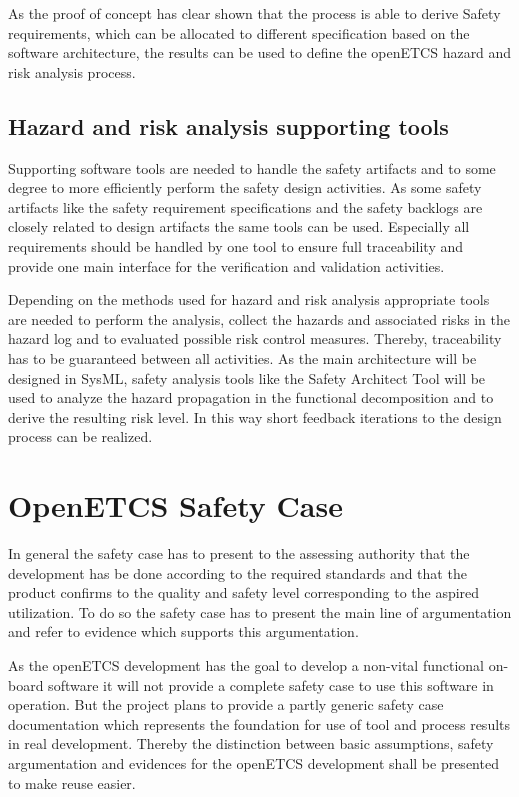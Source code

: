 \documentclass{template/openetcs_report}
\begin{document}
As the proof of concept has clear shown that the process is able to derive Safety requirements, which can be allocated to different specification based on the software architecture, the results can be used to define the openETCS hazard and risk analysis process.
 
\section{Hazard and risk analysis supporting tools}

Supporting software tools are needed to handle the safety artifacts and to some degree to more efficiently perform the safety design activities. As some safety artifacts like the safety requirement specifications and the safety backlogs are closely related to design artifacts the same tools can be used. Especially all requirements should be handled by one tool to ensure full traceability and provide one main interface for the verification and validation activities.

Depending on the methods used for hazard and risk analysis appropriate tools are needed to perform the analysis, collect the hazards and associated risks in the hazard log and to evaluated possible risk control measures. Thereby, traceability has to be guaranteed between all activities. As the main architecture will be designed in SysML, safety analysis tools like the Safety Architect Tool will be used to analyze the hazard propagation in the functional decomposition and to derive the resulting risk level. In this way short feedback iterations to the design process can be realized.

\chapter{OpenETCS Safety Case}
\label{sec:safetycase}

In general the safety case has to present to the assessing authority that the development has be done according to the required standards and that the product confirms to the quality and safety level corresponding to the aspired utilization. To do so the safety case has to present the main line of argumentation and refer to evidence which supports this argumentation.

As the openETCS development has the goal to develop a non-vital functional on-board software it will not provide a complete safety case to use this software in operation. But the project plans to provide a partly generic safety case documentation which represents the foundation for use of tool and process results in real development. Thereby the distinction between basic assumptions, safety argumentation and evidences for the openETCS development shall be presented to make reuse easier. 
\end{document}
